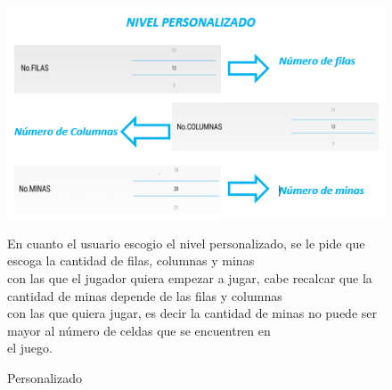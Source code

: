 \begin{figure}[htbp]
\begin{center}
\includegraphics[width=.70\textwidth]{./imagenes/Personalizado.png}
\caption{Personalizado}
\label{Personalizado}
\end{center}
En cuanto el usuario escogio el nivel personalizado, se le pide que escoga la cantidad de filas, columnas y minas 
\\con las que el jugador quiera empezar a jugar, cabe recalcar que la cantidad de minas depende de las filas y columnas
\\con las que quiera jugar, es decir la cantidad de minas no puede ser mayor al número de celdas que se encuentren en
\\el juego. 
\end{figure} 
\ \\ \ \\ \ \\ \ \\

